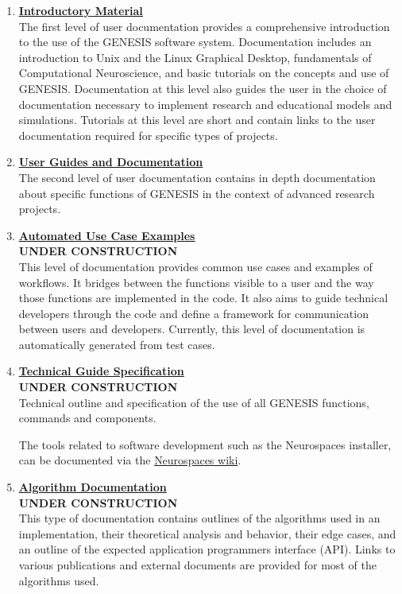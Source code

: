 \documentclass[12pt]{article}
\begin{document}
\begin{enumerate}

\item \href{../contents-level1/contents-level1.pdf}{\bf \underline{Introductory Material}}\\
The first level of user documentation provides a comprehensive introduction to the use of the GENESIS software system. Documentation includes an introduction to Unix and the Linux Graphical Desktop, fundamentals of Computational Neuroscience, and basic tutorials on the concepts and use of GENESIS. Documentation at this level also guides the user
  in the choice of documentation necessary to implement
  research and educational models and simulations.  Tutorials at this level
  are short and contain links to the user documentation required for
  specific types of projects.  

\item \href{../contents-level2/contents-level2.pdf}{\bf \underline{User Guides and Documentation}}\\
The second level of user documentation contains in depth
  documentation about specific functions of GENESIS in the context of
  advanced research projects.

\item \href{../contents-level3/contents-level3.pdf}{\bf \underline{Automated Use Case Examples}}\\
 {\bf UNDER CONSTRUCTION}\\
  This level of documentation provides common use cases and examples of workflows. It bridges between the functions visible to
  a user and the way those functions are implemented in the code.
  It also aims to guide technical developers through the code
  and define a framework for communication between users and developers.
  Currently, this level of documentation is automatically generated
  from test cases.
  
 \item \href{../contents-level4/contents-level4.pdf}{\bf \underline{Technical Guide Specification}}\\
 {\bf UNDER CONSTRUCTION}\\
  Technical outline
  and specification of the use of all GENESIS functions, commands and
  components.

  The tools related to software development such as the Neurospaces
  installer, can be documented via the \href{http://code.google.com/p/neurospaces/wiki/Index}{Neurospaces wiki}.

\item \href{../contents-level5/contents-level5.pdf}{\bf \underline{Algorithm Documentation}} \\
{\bf UNDER CONSTRUCTION}\\
  This type of documentation contains outlines of the
  algorithms used in an implementation, their theoretical analysis
  and behavior, their edge cases, and an outline of the expected
  application programmers interface (API).  Links to various publications
  and external documents are provided for most of the algorithms
  used.


\end{enumerate}
\end{document}

